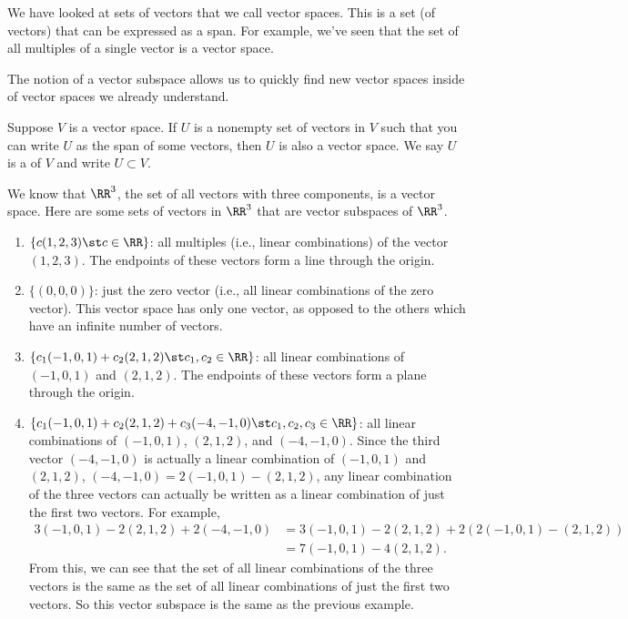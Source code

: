 We have looked at sets of vectors that we call vector spaces.  This is a set (of vectors) that can be expressed as a span.  For example, we've seen that the set of all multiples of a single vector is a vector space.

The notion of a vector subspace allows us to quickly find new vector spaces inside of vector spaces we already understand.

\begin{definition}
Suppose $V$ is a vector space. If $U$ is a nonempty set of vectors in $V$ such that you can write $U$ as the span of some vectors, then $U$ is also a vector space.  We say $U$ is a  of $V$ and write $U\subset V$.   
\end{definition}

\begin{example}
We know that $\RR^3$, the set of all vectors with three components, is a vector space.  Here are some sets of vectors in $\RR^3$ that are vector subspaces of $\RR^3$.
\begin{enumerate}
\item  $\{c(1,2,3) \st c\in\RR\}$: all multiples (i.e., linear combinations) of the vector $(1,2,3)$.  The endpoints of these vectors form a line through the origin.
\item $\{(0,0,0)\}$: just the zero vector (i.e., all linear combinations of the zero vector).  This vector space has only one vector, as opposed to the others which have an infinite number of vectors.
\item $\{c_1(-1,0,1)+c_2(2,1,2) \st c_1,c_2\in\RR\}$: all linear combinations of $(-1,0,1)$ and $(2,1,2)$. The endpoints of these vectors form a plane through the origin.
\item $\{c_1(-1,0,1)+c_2(2,1,2)+c_3(-4,-1,0) \st c_1,c_2,c_3\in\RR\}$: all linear combinations of $(-1,0,1)$, $(2,1,2)$, and $(-4,-1,0)$.  Since the third vector $(-4,-1,0)$ is actually a linear combination of $(-1,0,1)$ and $(2,1,2)$, $(-4,-1,0)=2(-1,0,1)-(2,1,2)$, any linear combination of the three vectors can actually be written as a linear combination of just the first two vectors.  For example, 
\begin{align*}
3(-1,0,1)-2(2,1,2)+2(-4,-1,0)&=3(-1,0,1)-2(2,1,2)+2(2(-1,0,1)-(2,1,2))\\
&=7(-1,0,1)-4(2,1,2).
\end{align*}
From this, we can see that the set of all linear combinations of the three vectors is the same as the set of all linear combinations of just the first two vectors.  So this vector subspace is the same as the previous example.
\end{enumerate}
\end{example}

